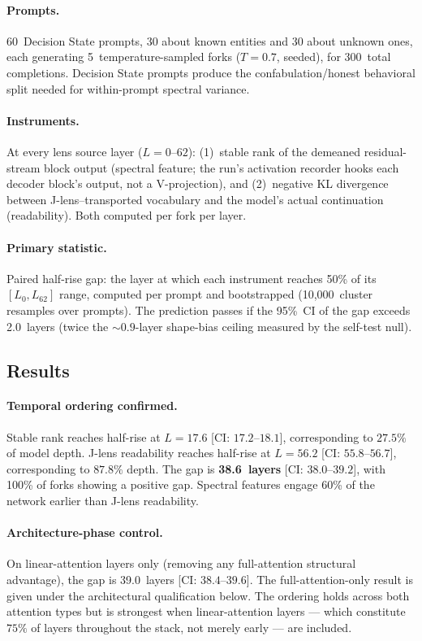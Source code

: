 \documentclass[11pt,a4paper]{article}
\begin{document}
\paragraph{Prompts.} 60~Decision State prompts, 30 about known
entities and 30 about unknown ones, each generating
5~temperature-sampled forks ($T{=}0.7$, seeded), for 300~total completions. Decision State prompts
produce the confabulation/honest behavioral split needed for
within-prompt spectral variance.

\paragraph{Instruments.} At every lens source layer ($L{=}0$--$62$):
(1)~stable rank of the demeaned residual-stream block output (spectral
feature; the run's activation recorder hooks each decoder block's
output, not a V-projection),
and (2)~negative KL divergence between J-lens--transported vocabulary
and the model's actual continuation (readability). Both computed per
fork per layer.

\paragraph{Primary statistic.} Paired half-rise gap: the layer at which
each instrument reaches 50\% of its $[L_0, L_{62}]$ range, computed per
prompt and bootstrapped (10{,}000~cluster resamples over prompts). The
prediction passes if the 95\%~CI of the gap exceeds 2.0~layers (twice
the ${\sim}0.9$-layer shape-bias ceiling measured by the self-test null).

\subsection{Results}

\paragraph{Temporal ordering confirmed.} Stable rank reaches half-rise
at $L{=}17.6$ [CI: $17.2$--$18.1$], corresponding to $27.5\%$ of model
depth. J-lens readability reaches half-rise at $L{=}56.2$
[CI: $55.8$--$56.7$], corresponding to $87.8\%$ depth. The gap is
\textbf{38.6~layers} [CI: $38.0$--$39.2$], with 100\% of forks showing
a positive gap. Spectral features engage 60\% of the network earlier
than J-lens readability.

\paragraph{Architecture-phase control.} On linear-attention layers only
(removing any full-attention structural advantage), the gap is
39.0~layers [CI: $38.4$--$39.6$]. The full-attention-only result is
given under the architectural qualification below. The ordering holds
across both attention types but is strongest when linear-attention
layers --- which constitute $75\%$ of layers throughout the stack, not
merely early --- are included.
\end{document}
